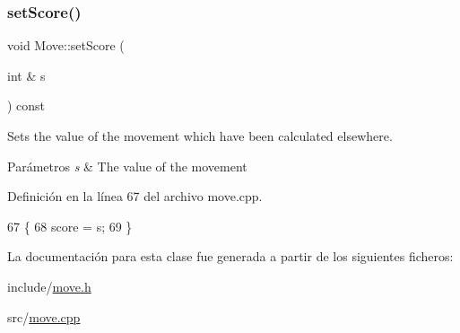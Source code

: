 \subsubsection{\texorpdfstring{set\+Score()}{setScore()}}
{\footnotesize\ttfamily void Move\+::set\+Score (\begin{DoxyParamCaption}\item[{int \&}]{s }\end{DoxyParamCaption}) const}



Sets the value of the movement which have been calculated elsewhere. 


\begin{DoxyParams}{Parámetros}
{\em s} & The value of the movement \\
\hline
\end{DoxyParams}


Definición en la línea 67 del archivo move.\+cpp.


\begin{DoxyCode}
67                               \{
68     score = s;
69 \}
\end{DoxyCode}


La documentación para esta clase fue generada a partir de los siguientes ficheros\+:\begin{DoxyCompactItemize}
\item 
include/\hyperlink{move_8h}{move.\+h}\item 
src/\hyperlink{move_8cpp}{move.\+cpp}\end{DoxyCompactItemize}
